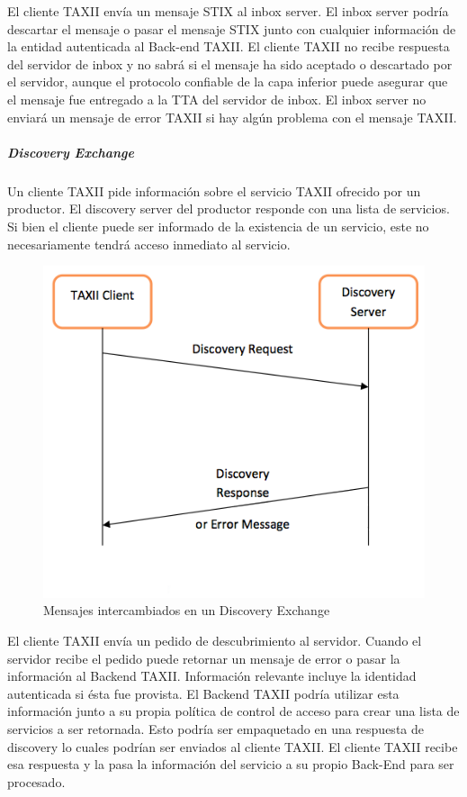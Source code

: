 El cliente TAXII envía un mensaje STIX al inbox server. El inbox server podría 
descartar el mensaje o pasar el mensaje STIX junto con cualquier información de 
la entidad autenticada al Back-end TAXII. El cliente TAXII no recibe respuesta 
del servidor de inbox y no sabrá si el mensaje ha sido aceptado o descartado por 
el servidor, aunque el protocolo confiable de la capa inferior puede asegurar 
que el mensaje fue entregado a la TTA del servidor de inbox. El inbox server no 
enviará un mensaje de error TAXII si hay algún problema con el mensaje TAXII.

\subparagraph{Discovery Exchange}

Un cliente TAXII pide información sobre el servicio TAXII ofrecido por un 
productor. El discovery server del productor responde con una lista de 
servicios. Si bien el cliente puede ser informado de la existencia de un 
servicio, este no necesariamente tendrá acceso inmediato al servicio.

\begin{figure}[ht!]
  \centering
    \includegraphics[width=150mm]{./images/DiscoveryExchange.png}
     \caption{Mensajes intercambiados en un Discovery Exchange \protect\cite{b1}}
\end{figure}

El cliente TAXII envía un pedido de descubrimiento al servidor. Cuando el 
servidor recibe el pedido puede retornar un mensaje de error o pasar la 
información al Backend TAXII. Información relevante incluye la identidad 
autenticada si ésta fue provista. El Backend TAXII podría utilizar esta 
información junto a su propia política de control de acceso  para crear una 
lista de servicios a ser retornada. Esto podría ser empaquetado en una 
respuesta de discovery lo cuales podrían ser enviados al cliente TAXII. El 
cliente TAXII recibe esa respuesta y la pasa la información del servicio a su 
propio Back-End para ser procesado.

